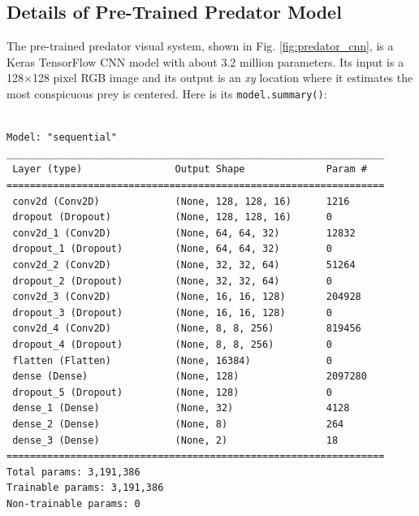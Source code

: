 \documentclass[letterpaper]{article}
\begin{document}
\subsection{Details of Pre-Trained Predator Model}
\begin{minipage}{\linewidth}
The pre-trained predator visual system, shown in Fig. \ref{fig:predator_cnn}, is a Keras TensorFlow CNN model with about 3.2 million parameters. Its input is a 128×128 pixel RGB image and its output is an \textit{xy} location where it estimates the most conspicuous prey is centered. Here is its \texttt{model.summary()}:
\par
\begin{minipage}{\linewidth-1.1cm}
\hspace*{1cm}
\begin{minipage}{\linewidth-1.1cm}
\begin{small}
\begin{verbatim}

Model: "sequential"
_________________________________________________________________
 Layer (type)                Output Shape              Param #
=================================================================
 conv2d (Conv2D)             (None, 128, 128, 16)      1216
 dropout (Dropout)           (None, 128, 128, 16)      0
 conv2d_1 (Conv2D)           (None, 64, 64, 32)        12832
 dropout_1 (Dropout)         (None, 64, 64, 32)        0
 conv2d_2 (Conv2D)           (None, 32, 32, 64)        51264
 dropout_2 (Dropout)         (None, 32, 32, 64)        0
 conv2d_3 (Conv2D)           (None, 16, 16, 128)       204928
 dropout_3 (Dropout)         (None, 16, 16, 128)       0
 conv2d_4 (Conv2D)           (None, 8, 8, 256)         819456
 dropout_4 (Dropout)         (None, 8, 8, 256)         0
 flatten (Flatten)           (None, 16384)             0
 dense (Dense)               (None, 128)               2097280
 dropout_5 (Dropout)         (None, 128)               0
 dense_1 (Dense)             (None, 32)                4128
 dense_2 (Dense)             (None, 8)                 264
 dense_3 (Dense)             (None, 2)                 18
=================================================================
Total params: 3,191,386
Trainable params: 3,191,386
Non-trainable params: 0
\end{verbatim}
\end{small}
\end{minipage}
\end{minipage}
\end{minipage}
\par
\end{document}
